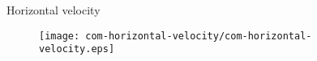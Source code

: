 \begin{frame}{Horizontal velocity}%
    \begin{figure}[htb]%
        \centering%
        \texttt{[image: com-horizontal-velocity/com-horizontal-velocity.eps]}
    \end{figure}%
\end{frame}%
%